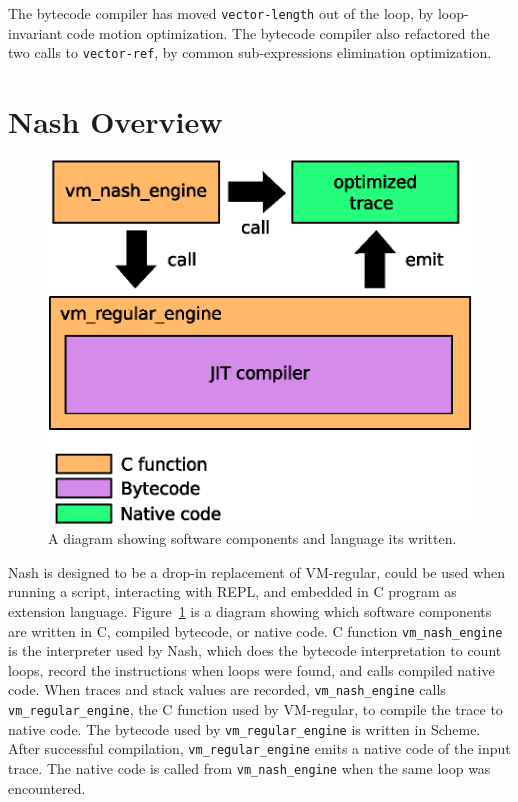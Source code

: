 \documentclass[preprint]{sigplanconf}
\begin{document}
The bytecode compiler has moved \texttt{vector-length} out of the loop, by
loop-invariant code motion optimization. The bytecode compiler also refactored
the two calls to \texttt{vector-ref}, by common sub-expressions elimination
optimization.

\section{Nash Overview}
\label{sec:overview}


\begin{figure}
  \begin{center}
    \includegraphics[width=0.4 \textwidth]{overview}
    \caption{A diagram showing software components and language its written.}
  \end{center}
\label{fig:overview}
\end{figure}

Nash is designed to be a drop-in replacement of VM-regular, could be used when
running a script, interacting with REPL, and embedded in C program as
extension language. Figure~\hyperref[fig:overview]{\ref{fig:overview}} is a
diagram showing which software components are written in C, compiled bytecode,
or native code. C function \texttt{vm\_nash\_engine} is the interpreter used
by Nash, which does the bytecode interpretation to count loops, record the
instructions when loops were found, and calls compiled native code. When
traces and stack values are recorded, \texttt{vm\_nash\_engine} calls
\texttt{vm\_regular\_engine}, the C function used by VM-regular, to compile
the trace to native code. The bytecode used by \texttt{vm\_regular\_engine} is
written in Scheme. After successful compilation, \texttt{vm\_regular\_engine}
emits a native code of the input trace. The native code is called from
\texttt{vm\_nash\_engine} when the same loop was encountered.
\end{document}
